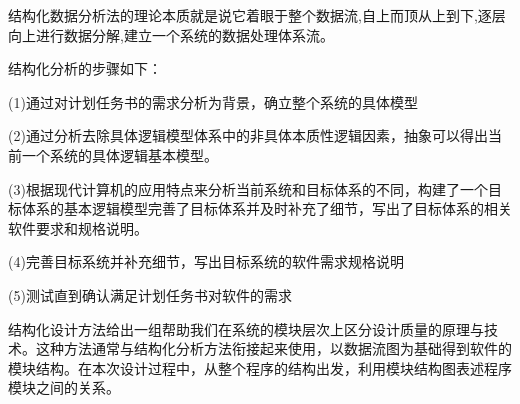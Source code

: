 结构化数据分析法的理论本质就是说它着眼于整个数据流,自上而顶从上到下,逐层向上进行数据分解,建立一个系统的数据处理体系流。

结构化分析的步骤如下：

(1)通过对计划任务书的需求分析为背景，确立整个系统的具体模型

(2)通过分析去除具体逻辑模型体系中的非具体本质性逻辑因素，抽象可以得出当前一个系统的具体逻辑基本模型。

(3)根据现代计算机的应用特点来分析当前系统和目标体系的不同，构建了一个目标体系的基本逻辑模型完善了目标体系并及时补充了细节，写出了目标体系的相关软件要求和规格说明。

(4)完善目标系统并补充细节，写出目标系统的软件需求规格说明

(5)测试直到确认满足计划任务书对软件的需求

结构化设计方法给出一组帮助我们在系统的模块层次上区分设计质量的原理与技术。这种方法通常与结构化分析方法衔接起来使用，以数据流图为基础得到软件的模块结构。在本次设计过程中，从整个程序的结构出发，利用模块结构图表述程序模块之间的关系。







